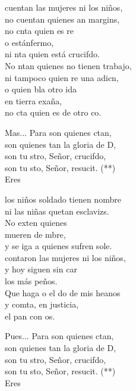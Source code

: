 \begin{cancion}%
	cuentan las mujeres ni los niños,\\
	no cuentan quienes an margins,\\
	no cnta quien es re \\
	o estánfermo,\\
	ni nta quien está crucifdo.\\
	No ntan quienes no tienen trabajo,\\
	ni tampoco quien re una adicn, \\
	o quien bla otro ida \\
	en tierra exaña,\\
	no cta quien es de otro co.\\
	\begin{chorus}%
	Mas... Para  son quienes ctan,\\
	son quienes tan la gloria de D,\\
	son tu stro, Señor, crucifdo,\\
	son tu sto, Señor, resucit. (**)\\
	Eres  \\
	\end{chorus}%
	los niños soldado tienen nombre\\
	ni las niñas quetan esclavizs.\\
	No exten quienes \\
	 mueren de mbre,\\
	y se iga a quienes sufren sole.\\
	contaron las mujeres ni los niños,\\
	y hoy siguen sin car \\
	los más peños.\\
	Que haga o el do de mis heanos \\
	y comta, en justicia, \\
	el pan con os.\\
	\begin{chorus}%
	Pues... Para  son quienes ctan,\\
	son quienes tan la gloria de D,\\
	son tu stro, Señor, crucifdo,\\
	son tu sto, Señor, resucit. (**)\\
	Eres  \\
	\end{chorus}%
\end{cancion}%
